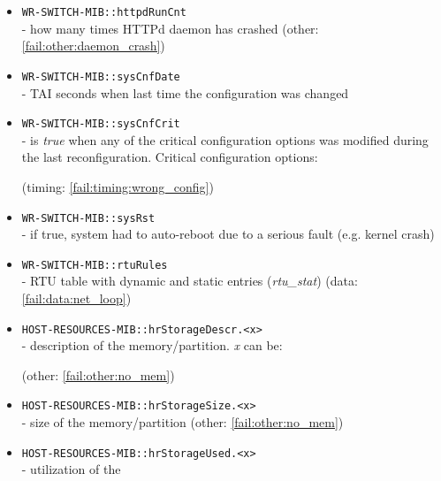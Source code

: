 \begin{itemize}[leftmargin=0pt]
	\item [] \texttt{WR-SWITCH-MIB::httpdRunCnt}\\ - how many times HTTPd daemon
		has crashed (other: \ref{fail:other:daemon_crash})
	\item [] \texttt{WR-SWITCH-MIB::sysCnfDate}\\ - TAI seconds when last
		time the configuration was changed
	\item [] \texttt{WR-SWITCH-MIB::sysCnfCrit}\\ - is \emph{true} when any of
		the critical configuration options was modified during the last
		reconfiguration. Critical configuration options:
		(timing: \ref{fail:timing:wrong_config})
	\item [] \texttt{WR-SWITCH-MIB::sysRst}\\ - if true, system had to auto-reboot
		due to a serious fault (e.g. kernel crash)
	\item [] \texttt{WR-SWITCH-MIB::rtuRules}\\ - RTU table with dynamic and
		static entries (\emph{rtu\_stat}) (data: \ref{fail:data:net_loop})
	\item [] \texttt{HOST-RESOURCES-MIB::hrStorageDescr.<x>}\\ - description of
		the memory/partition. \emph{x} can be:
		(other: \ref{fail:other:no_mem})
	\item [] \texttt{HOST-RESOURCES-MIB::hrStorageSize.<x>}\\ - size of the
		memory/partition (other: \ref{fail:other:no_mem})
	\item [] \texttt{HOST-RESOURCES-MIB::hrStorageUsed.<x>}\\ - utilization of the

\end{itemize}
